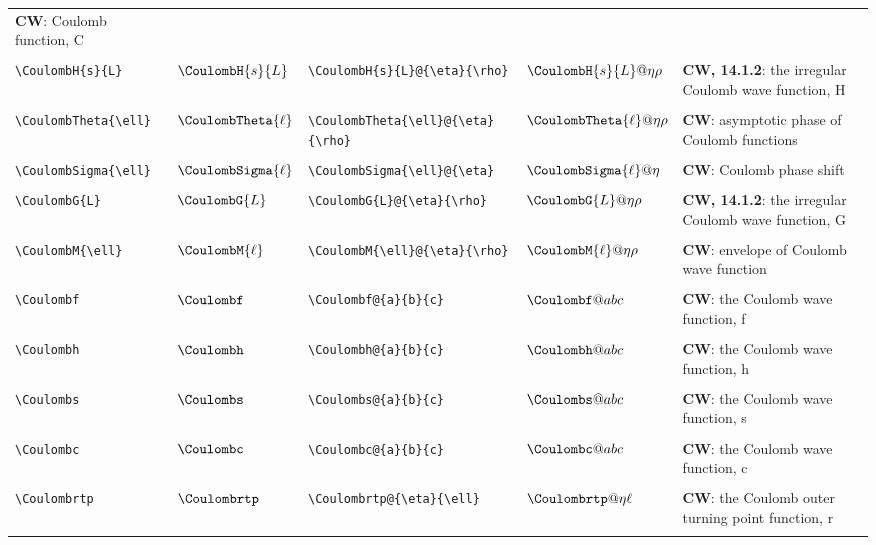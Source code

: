 \begin{supertabular}{ll|ll|p{2in}}
\textbf{CW}: Coulomb function, C\\*
&&&&\\[-1ex]
\verb~\CoulombH{s}{L}~ & $\CoulombH{s}{L}$ & 
\verb~\CoulombH{s}{L}@{\eta}{\rho}~ & $\CoulombH{s}{L}@{\eta}{\rho}$ & 
\textbf{CW, 14.1.2}: the irregular Coulomb wave function, H\\*
&&&&\\[-1ex]
\verb~\CoulombTheta{\ell}~ & $\CoulombTheta{\ell}$ & 
\verb~\CoulombTheta{\ell}@{\eta}{\rho}~ & $\CoulombTheta{\ell}@{\eta}{\rho}$ & 
\textbf{CW}: asymptotic phase of Coulomb functions\\*
&&&&\\[-1ex]
\verb~\CoulombSigma{\ell}~ & $\CoulombSigma{\ell}$ & 
\verb~\CoulombSigma{\ell}@{\eta}~ & $\CoulombSigma{\ell}@{\eta}$ & 
\textbf{CW}: Coulomb phase shift\\*
&&&&\\[-1ex]
\verb~\CoulombG{L}~ & $\CoulombG{L}$ & 
\verb~\CoulombG{L}@{\eta}{\rho}~ & $\CoulombG{L}@{\eta}{\rho}$ & 
\textbf{CW, 14.1.2}: the irregular Coulomb wave function, G\\*
&&&&\\[-1ex]
\verb~\CoulombM{\ell}~ & $\CoulombM{\ell}$ & 
\verb~\CoulombM{\ell}@{\eta}{\rho}~ & $\CoulombM{\ell}@{\eta}{\rho}$ & 
\textbf{CW}: envelope of Coulomb wave function\\*
&&&&\\[-1ex]
\verb~\Coulombf~ & $\Coulombf$ & 
\verb~\Coulombf@{a}{b}{c}~ & $\Coulombf@{a}{b}{c}$ & 
\textbf{CW}: the Coulomb wave function, f\\*
&&&&\\[-1ex]
\verb~\Coulombh~ & $\Coulombh$ & 
\verb~\Coulombh@{a}{b}{c}~ & $\Coulombh@{a}{b}{c}$ & 
\textbf{CW}: the Coulomb wave function, h\\*
&&&&\\[-1ex]
\verb~\Coulombs~ & $\Coulombs$ & 
\verb~\Coulombs@{a}{b}{c}~ & $\Coulombs@{a}{b}{c}$ & 
\textbf{CW}: the Coulomb wave function, s\\*
&&&&\\[-1ex]
\verb~\Coulombc~ & $\Coulombc$ & 
\verb~\Coulombc@{a}{b}{c}~ & $\Coulombc@{a}{b}{c}$ & 
\textbf{CW}: the Coulomb wave function, c\\*
&&&&\\[-1ex]
\verb~\Coulombrtp~ & $\Coulombrtp$ & 
\verb~\Coulombrtp@{\eta}{\ell}~ & $\Coulombrtp@{\eta}{\ell}$ & 
\textbf{CW}: the Coulomb outer turning point function, r\\*
&&&&\\[-1ex]

\end{supertabular}
